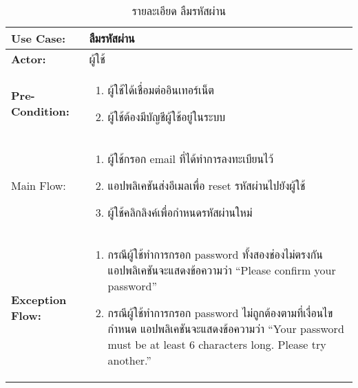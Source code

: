 \begin{table}
    \caption{รายละเอียด ลืมรหัสผ่าน}
    \begin{tabularx}{\textwidth}{ | >{\centering\bf} p{3cm} | X |}
        \hline
        Use Case: & ลืมรหัสผ่าน \\\hline
        Actor: & ผู้ใช้ \\\hline
        Pre-Condition: &
        \begin{enumerate}[table]
            \item ผู้ใช้ได้เชื่อมต่ออินเทอร์เน็ต
            \item ผู้ใช้ต้องมีบัญชีผู้ใช้อยู่ในระบบ
        \end{enumerate} \\\hline
        
        Main Flow: & 
        \begin{enumerate}[table]
            \item ผู้ใช้กรอก email ที่ได้ทำการลงทะเบียนไว้
            \item แอปพลิเคชันส่งอีเมลเพื่อ reset รหัสผ่านไปยังผู้ใช้
            \item ผู้ใช้คลิกลิงค์เพื่อกำหนดรหัสผ่านใหม่
        \end{enumerate}\\\hline
        Exception Flow: & 
        \begin{enumerate}[table]
            \item กรณีผู้ใช้ทำการกรอก password ทั้งสองช่องไม่ตรงกัน แอปพลิเคชันจะแสดงข้อความว่า “Please confirm your password”
            \item กรณีผู้ใช้ทำการกรอก password ไม่ถูกต้องตามที่เงื่อนไขกำหนด แอปพลิเคชันจะแสดงข้อความว่า “Your password must be at least 6 characters long. Please try another.”
        \end{enumerate}\\\hline
    \end{tabularx}
\end{table}


